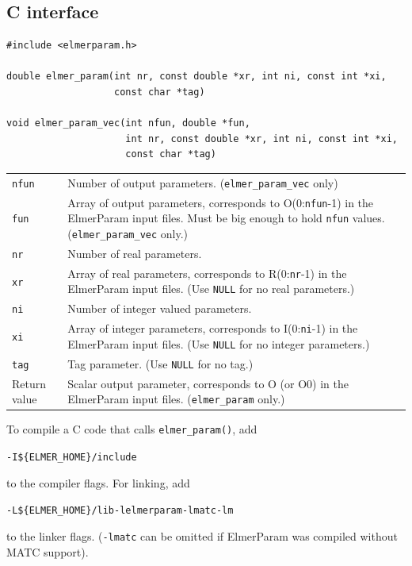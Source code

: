 \documentclass[12pt,a4paper]{article}
\newcommand{\ttbegin}{\begin{alltt}}
\newcommand{\ttend}{\end{alltt}}
\newcommand{\code}[1]{\texttt{#1}}
\begin{document}
\subsection{C interface}

\begin{verbatim}
#include <elmerparam.h>

double elmer_param(int nr, const double *xr, int ni, const int *xi,
                   const char *tag)

void elmer_param_vec(int nfun, double *fun,
                     int nr, const double *xr, int ni, const int *xi,
                     const char *tag)
\end{verbatim}
\begin{table}[H]
\begin{tabular}{ll}
    \code{nfun} &Number of output parameters. (\code{elmer\_param\_vec}
    only)\\

    \code{fun} &\parbox[t]{10cm}{Array of output parameters, corresponds to
    O(0:\code{nfun}-1) in the ElmerParam input files.  Must be big enough to
    hold \code{nfun} values. (\code{elmer\_param\_vec} only.)}\\

    \code{nr} &Number of real parameters.\\

    \code{xr} &\parbox[t]{10cm}{Array of real parameters, corresponds to
    R(0:\code{nr}-1) in the ElmerParam input files. (Use \code{NULL} for no
    real parameters.)}\\

    \code{ni} &Number of integer valued parameters.\\

    \code{xi} &\parbox[t]{10cm}{Array of integer parameters, corresponds to
    I(0:\code{ni}-1) in the ElmerParam input files.  (Use \code{NULL} for no
    integer parameters.)}\\

    \code{tag} &Tag parameter. (Use \code{NULL} for no tag.)\\

    Return value &\parbox[t]{10cm}{Scalar output parameter, corresponds to
    O (or O0) in the ElmerParam input files. (\code{elmer\_param} only.)}

\end{tabular}
\end{table}

\noindent To compile a C code that calls \code{elmer\_param()}, add
\ttbegin
-I\$\{ELMER\_HOME\}/include
\ttend
to the compiler flags.  For linking, add
\ttbegin
-L\$\{ELMER\_HOME\}/lib -lelmerparam -lmatc -lm
\ttend
to the linker flags. (\code{-lmatc} can be omitted if ElmerParam was
compiled without MATC support).
\end{document}
